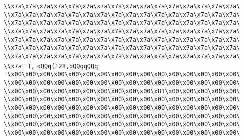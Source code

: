\verb|\\x7a\x7a\x7a\x7a\x7a\x7a\x7a\x7a\x7a\x7a\x7a\x7a\x7a\x7a\x7a\x7a\|\newline
\verb|\\x7a\x7a\x7a\x7a\x7a\x7a\x7a\x7a\x7a\x7a\x7a\x7a\x7a\x7a\x7a\x7a\|\newline
\verb|\\x7a\x7a\x7a\x7a\x7a\x7a\x7a\x7a\x7a\x7a\x7a\x7a\x7a\x7a\x7a\x7a\|\newline
\verb|\\x7a\x7a\x7a\x7a\x7a\x7a\x7a\x7a\x7a\x7a\x7a\x7a\x7a\x7a\x7a\x7a\|\newline
\verb|\\x7a\x7a\x7a\x7a\x7a\x7a\x7a\x7a\x7a\x7a\x7a\x7a\x7a\x7a\x7a\x7a\|\newline
\verb|\\x7a\x7a\x7a\x7a\x7a\x7a\x7a\x7a\x7a\x7a\x7a\x7a\x7a\x7a\x7a\x7a\|\newline
\verb|\\x7a\x7a\x7a\x7a\x7a\x7a\x7a\x7a\x7a\x7a\x7a\x7a\x7a\x7a\x7a\x7a\|\newline
\verb|\\x7a"|\newline
\verb|),|\newline
\verb|qQQq(128,qQQqqQQq|\newline
\verb|"\x00\x00\x00\x00\x00\x00\x00\x00\x00\x00\x00\x00\x00\x00\x00\x00\|\newline
\verb|\\x00\x00\x00\x00\x00\x00\x00\x00\x00\x00\x00\x00\x00\x00\x00\x00\|\newline
\verb|\\x00\x00\x00\x00\x00\x00\x00\x00\x00\x00\x81\x00\x00\x00\x00\x00\|\newline
\verb|\\x00\x00\x00\x00\x00\x00\x00\x00\x00\x00\x00\x00\x00\x00\x00\x00\|\newline
\verb|\\x00\x00\x00\x00\x00\x00\x00\x00\x00\x00\x00\x00\x00\x00\x00\x00\|\newline
\verb|\\x00\x00\x00\x00\x00\x00\x00\x00\x00\x00\x00\x00\x00\x00\x00\x00\|\newline
\verb|\\x00\x00\x00\x00\x00\x00\x00\x00\x00\x00\x00\x00\x00\x00\x00\x00\|\newline
\verb|\\x00\x00\x00\x00\x00\x00\x00\x00\x00\x00\x00\x00\x00\x00\x00\x00\|\newline
